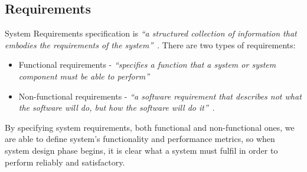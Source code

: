 \subsection{Requirements}
System Requirements specification is \textit{``a structured collection of information that embodies the requirements of the system''}~\cite{ISO2010ISO/IEC/Vocabulary}. There are two types  of requirements: 
\begin{itemize}[noitemsep]
    \item Functional requirements - \textit{``specifies a function that a system or system component must be able
to perform''}~\cite{ISO2010ISO/IEC/Vocabulary}
    \item Non-functional requirements - \textit{``a software requirement that describes not what the software will do, but how the software will do it''}~\cite{ISO2010ISO/IEC/Vocabulary}.
\end{itemize}

By specifying system requirements, both functional and non-functional ones, we are able to define system's functionality and performance metrics, so when system design phase begins, it is clear what a system must fulfil in order to perform reliably and satisfactory.  
